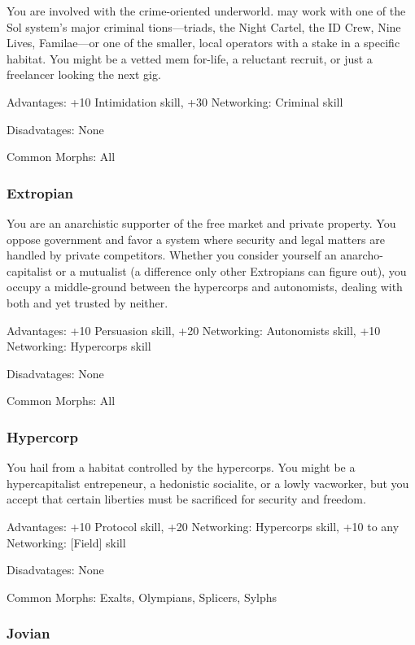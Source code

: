 You are involved with the crime-oriented underworld. may work with one of the Sol system’s major criminal tions—triads, the Night Cartel, the ID Crew, Nine Lives, Familae—or one of the smaller, local operators with a stake in a specific habitat. You might be a vetted mem for-life, a reluctant recruit, or just a freelancer looking the next gig. 

Advantages: +10 Intimidation skill, +30 Networking: Criminal skill 

Disadvatages: None 

Common Morphs: All 

\subsubsection{Extropian} \label{sec:extropian} 

You are an anarchistic supporter of the free market and private property. You oppose government and favor a system where security and legal matters are handled by private competitors. Whether you consider yourself an anarcho-capitalist or a mutualist (a difference only other Extropians can figure out), you occupy a middle-ground between the hypercorps and autonomists, dealing with both and yet trusted by neither. 

Advantages: +10 Persuasion skill, +20 Networking: Autonomists skill, +10 Networking: Hypercorps skill 

Disadvatages: None 

Common Morphs: All 

\subsubsection{Hypercorp} \label{sec:hypercorp} 

You hail from a habitat controlled by the hypercorps. You might be a hypercapitalist entrepeneur, a hedonistic socialite, or a lowly vacworker, but you accept that certain liberties must be sacrificed for security and freedom. 

Advantages: +10 Protocol skill, +20 Networking: Hypercorps skill, +10 to any Networking: [Field] skill 

Disadvatages: None 

Common Morphs: Exalts, Olympians, Splicers, Sylphs 

\subsubsection{Jovian} \label{sec:jovian} 

